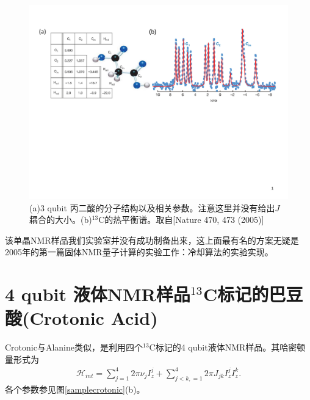 \begin{figure}[htbp]
            \begin{center}
              \includegraphics[width= 0.8\columnwidth]{figures/samples3.pdf}
              \caption{(a)3 qubit 丙二酸的分子结构以及相关参数。注意这里并没有给出$J$耦合的大小。(b)$^{13}$C的热平衡谱。取自[Nature 470, 473 (2005)\cite{app25}]}
              \label{samples3}
            \end{center}
\end{figure}

该单晶NMR样品我们实验室并没有成功制备出来，这上面最有名的方案无疑是2005年的第一篇固体NMR量子计算的实验工作：冷却算法的实验实现\cite{app25}。

\section{4 qubit 液体NMR样品$^{13}$C标记的巴豆酸(Crotonic Acid)}

Crotonic与Alanine类似，是利用四个$^{13}$C标记的4 qubit液体NMR样品。其哈密顿量形式为
\begin{eqnarray}
\mathcal{H}_{int}=\sum\limits_{j=1}^4 {2\pi \nu _j } I_z^j  + \sum\limits_{j < k,=1}^4 {2\pi} J_{jk} I_z^j I_z^k.
\end{eqnarray}
各个参数参见图\ref{samplecrotonic}(b)。

